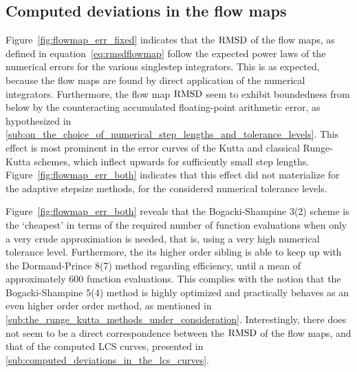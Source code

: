 \subsection{Computed deviations in the flow maps}
\label{sub:computed_deviations_in_the_flow_maps}


Figure~\ref{fig:flowmap_err_fixed} indicates that the $\operatorname{RMSD}$ of the flow maps,
as defined in equation~\eqref{eq:rmsdflowmap} follow the expected power laws
of the numerical errors for the various singlestep integrators. This is
as expected, because the flow maps are found by direct application of the
numerical integrators. Furthermore, the flow map $\operatorname{RMSD}$ seem to exhibit
boundedness from below by the counteracting accumulated floating-point
arithmetic error, as hypothesized in
\cref{sub:on_the_choice_of_numerical_step_lengths_and_tolerance_levels}.
This effect is most prominent in the error curves of the Kutta and
classical Runge-Kutta schemes, which inflect upwards for sufficiently small
step lengths. Figure~\ref{fig:flowmap_err_both} indicates that this effect
did not materialize for the adaptive stepsize methods, for the considered
numerical tolerance levels.

Figure~\ref{fig:flowmap_err_both} reveals that the Bogacki-Shampine 3(2) scheme
is the `cheapest' in terms of the required number of function evaluations when
only a very crude approximation is needed, that is, using a very high
numerical tolerance level. Furthermore, the its higher order sibling is able
to keep up with the Dormand-Prince 8(7) method regarding efficiency, until
a mean of approximately $600$ function evaluations. This complies with the
notion that the Bogacki-Shampine 5(4) method is highly optimized and practically
behaves as an even higher order order method, as mentioned in
\cref{sub:the_runge_kutta_methods_under_consideration}.
Interestingly, there does not seem to be a direct correspondence between the
$\operatorname{RMSD}$ of the flow maps, and that of the computed LCS curves, presented in
\cref{sub:computed_deviations_in_the_lcs_curves}.




